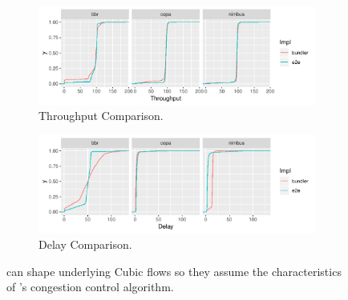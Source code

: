 \begin{figure}
    \centering
    \begin{subfigure}[b]{0.5\textwidth}
\begin{knitrout}
\color{fgcolor}
\includegraphics[width=\maxwidth]{figure/cc:comparison:a-1} 

\end{knitrout}
    \caption{Throughput Comparison.}\label{fig:cc:comparison:a}
    \end{subfigure}
    \begin{subfigure}[b]{0.5\textwidth}
\begin{knitrout}
\color{fgcolor}
\includegraphics[width=\maxwidth]{figure/cc:comparison:b-1} 

\end{knitrout}
    \caption{Delay Comparison.}\label{fig:cc:comparison:b}
    \end{subfigure}

    \caption{\name can shape underlying Cubic flows so they assume the characteristics of \name's congestion control algorithm.}
    \label{fig:cc:comparison}
\end{figure}
